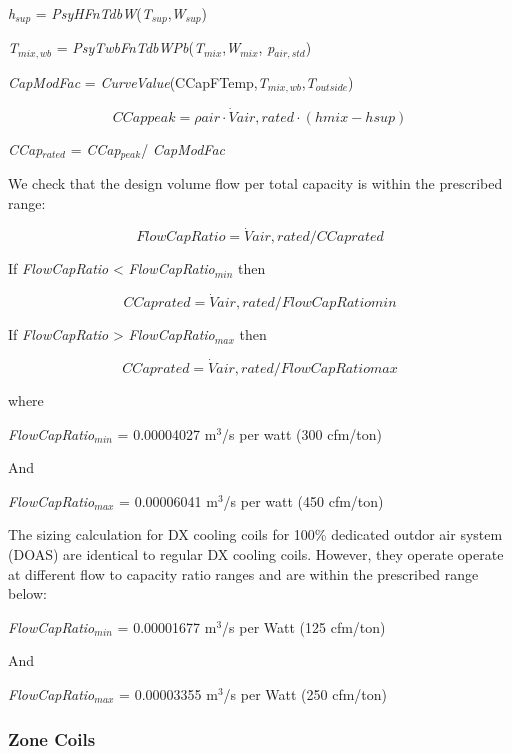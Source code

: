 \emph{h\(_{sup}\)} = \emph{PsyHFnTdbW}(\emph{T\(_{sup}\)},\emph{W\(_{sup}\)})

\emph{T\(_{mix,wb}\)} = \emph{PsyTwbFnTdbWPb}(\emph{T\(_{mix}\)},\emph{W\(_{mix}\)}, \emph{p\(_{air,std}\)})

\emph{CapModFac} = \emph{CurveValue}(CCapFTemp,\emph{T\(_{mix,wb}\)},\emph{T\(_{outside}\)})

\begin{equation}
CCappeak = \rho air\cdot \dot Vair,rated\cdot (hmix - hsup)
\end{equation}

\emph{CCap\(_{rated}\)} = \emph{CCap\(_{peak}\)}/ \emph{CapModFac}

We check that the design volume flow per total capacity is within the prescribed range:

\begin{equation}
FlowCapRatio = \dot Vair,rated/CCaprated
\end{equation}

If \emph{FlowCapRatio} \textless{} \emph{FlowCapRatio\(_{min}\)} then

\begin{equation}
CCaprated = \dot Vair,rated/FlowCapRatiomin
\end{equation}

If \emph{FlowCapRatio} \textgreater{} \emph{FlowCapRatio\(_{max}\)} then

\begin{equation}
CCaprated = \dot Vair,rated/FlowCapRatiomax
\end{equation}

where

\emph{FlowCapRatio\(_{min}\)} = 0.00004027 m\(^{3}\)/s per watt (300 cfm/ton)

And

\emph{FlowCapRatio\(_{max}\)} = 0.00006041 m\(^{3}\)/s per watt (450 cfm/ton)

The sizing calculation for DX cooling coils for 100\% dedicated outdor air system (DOAS) are identical to regular DX cooling coils. However, they operate operate at different flow to capacity ratio ranges and are within the prescribed range below:

\emph{FlowCapRatio\(_{min}\)} = 0.00001677 m\(^{3}\)/s per Watt (125 cfm/ton)

And

\emph{FlowCapRatio\(_{max}\)} = 0.00003355 m\(^{3}\)/s per Watt (250 cfm/ton)

\subsubsection{Zone Coils}\label{zone-coils-5}

